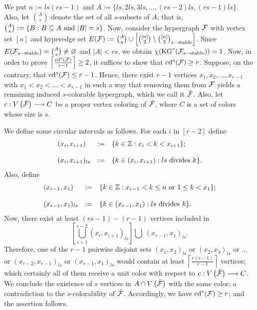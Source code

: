 \documentclass[11pt]{article}
\begin{document}
    We put $n:=ls(rs-1)$ and
	$A:= \{ls, 2ls, 3ls, \dots , (rs-2)ls , (rs-1)ls\}$. Also, let ${A \choose s}$ denote the set of all $s$-subsets of $A$, that is, ${A \choose s} := \{B : B \subseteq A \ {\rm and} \ |B|=s \}$.
	Now, consider the hypergraph ${\cal F}$ with vertex set $[n]$ and hyperedge set
	$E({\cal F}) := {A \choose s} \cup \left[   {[n] \choose 2} \setminus {[n] \choose 2}_{s-{\rm stable}}   \right]$.
	Since $E({\cal F}_{s-{\rm stable}}) = {A \choose s} \neq \varnothing$ and $|A| < rs$, we obtain
	$\chi ({\rm KG}^r ({\cal F}_{s-{\rm stable}}))=1$.
	Now, in order to prove
	$\left\lceil  \frac{{\rm cd}^s ({\cal F})}{r-1}   \right\rceil  \geq 2$,
	it suffices to show that
	${\rm cd}^s ({\cal F}) \geq r$.
	Suppose, on the contrary, that ${\rm cd}^s ({\cal F}) \leq r-1$.
	Hence, there exist $r-1$ vertices $x_{1} , x_{2} , \dots , x_{r-1}$ with
	$x_{1} < x_{2} < \dots < x_{r-1}$ in such a way that removing them from ${\cal F}$
	yields a remaining induced $s$-colorable hypergraph, which we call it $\tilde{{\cal F}}$.
	Also, let $c:V \left( \tilde{{\cal F}} \right) \longrightarrow C$ be a proper vertex coloring of $\tilde{{\cal F}}$, where $C$ is a set of colors whose size is $s$.
	
	\noindent 
	We define some circular intervals as follows.
	For each $i$ in $[r-2]$ define
	$$\begin{array}[3]{lll}
		(x_{i} , x_{i+1})   &  :=    &  \{ k \in {\mathbb{Z}} : x_{i} < k < x_{i+1}\};  \\
		                    &        &            \\
		(x_{i} , x_{i+1})_{ls} &  := &  \{ k \in (x_{i} , x_{i+1}) : ls \ {\rm divides} \ k\}.    \\
	\end{array}$$
    Also, define
	$$\begin{array}[3]{lll}
		(x_{r-1} , x_{1})   &  :=    &  \{ k \in {\mathbb{Z}} : x_{r-1} < k \leq n \ {\rm or} \ 1\leq k < x_{1}\};  \\
		&        &            \\
		(x_{r-1} , x_{1})_{ls} &  := &  \{ k \in (x_{r-1} , x_{1}) : ls \ {\rm divides} \ k\}.    \\
	\end{array}$$
	Now, there exist at least
	$(rs-1)-(r-1)$ vertices included in
	$$\left[   \bigcup _{i=1}^{r-2}   (x_{i} , x_{i+1})_{ls}    \right]   \bigcup   \  (x_{r-1} , x_{1})_{ls}.$$ Therefore, one of the $r-1$ pairwise disjoint sets
	$(x_{1} , x_{2})_{ls}$ or $(x_{2} , x_{3})_{ls}$ or $\dots $ or $(x_{r-2} , x_{r-1})_{ls}$
	or $(x_{r-1} , x_{1})_{ls}$ would contain at least
	$\left\lceil  \frac{r(s-1)}{r-1}   \right\rceil$ vertices; which certainly all of them
	receive a unit color with respect to $c:V \left(  \tilde{{\cal F}}  \right) \longrightarrow C$. We conclude the existence of $s$ vertices in $A \cap V \left(  \tilde{{\cal F}}  \right)$ with the same color; a contradiction to the $s$-colorability of $\tilde{{\cal F}}$. Accordingly, we have
	${\rm cd}^s ({\cal F}) \geq r$; and the assertion follows.	
\end{document}
